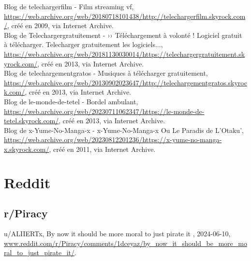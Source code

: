 Blog de telechargerfilm - Film streaming vf, \href{https://web.archive.org/web/20180718101438/http://telechargerfilm.skyrock.com/}{https://web.archive.org/web/20180718101438/http://telechargerfilm.skyrock.com/}, créé en 2009, via Internet Archive. \\

Blog de Telechargergratuitement - ›› Téléchargement à volonté ! Logiciel gratuit à télécharger. Telecharger gratuitement les logiciels..., \href{https://web.archive.org/web/20181130030014/https://telechargergratuitement.skyrock.com/}{https://web.archive.org/web/20181130030014/https://telechargergratuitement.skyrock.com/}, créé en 2013, via Internet Archive. \\

Blog de telechargementgratos - Musiques à télécharger gratuitement, \href{https://web.archive.org/web/20130902023647/http://telechargementgratos.skyrock.com/}{https://web.archive.org/web/20130902023647/http://telechargementgratos.skyrock.com/}, créé en 2013, via Internet Archive. \\

Blog de le-monde-de-tetel - Bordel ambulant, \href{https://web.archive.org/web/20230711062347/https://le-monde-de-tetel.skyrock.com/}{https://web.archive.org/web/20230711062347/https://le-monde-de-tetel.skyrock.com/}, créé en 2013, via Internet Archive. \\

Blog de x-Yume-No-Manga-x - x-Yume-No-Manga-x Ou Le Paradis de L'Otaku', \href{https://web.archive.org/web/20230812201236/https://x-yume-no-manga-x.skyrock.com/}{https://web.archive.org/web/20230812201236/https://x-yume-no-manga-x.skyrock.com/}, créé en 2011, via Internet Archive.\\

\section*{Reddit}

\subsection*{r/Piracy}

u/ALIIERTx, \og By now it should be more moral to just pirate it \fg, 2024-06-10, \href{www.reddit.com/r/Piracy/comments/1dceyaz/by\_now\_it\_should\_be\_more\_moral\_to\_just\_pirate\_it/}{www.reddit.com/r/Piracy/comments/1dceyaz/by\_now\_it\_should\_be\_more\_moral\_to\_just\_pirate\_it/}. \\

